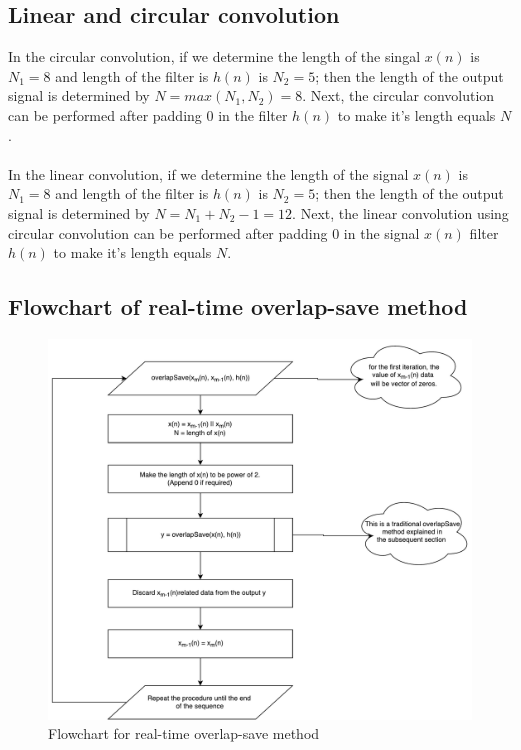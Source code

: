 \begin{refsection}
\subsection*{Linear and circular convolution}
In the circular convolution, if we determine the length of the singal $x(n)$ is $N_{1} = 8$ and length of the filter is  $h(n)$ is $N_{2} = 5$; then the length of the output signal is determined by $N = max(N_{1} , N_{2} )=8$. Next, the circular convolution can be performed after padding $0$ in the filter $h(n)$ to make it's length equals $N$. \\ \\
In the linear convolution, if we determine the length of the signal $x(n)$ is $N_{1} = 8$ and length of the filter is  $h(n)$ is $N_{2} = 5$; then the length of the output signal is determined by $N = N_{1}+N_{2}-1 = 12$. Next, the linear convolution using circular convolution can be performed after padding $0$ in the signal $x(n)$ filter $h(n)$ to make it's length equals $N$.

\subsection*{Flowchart of real-time overlap-save method}
\begin{figure}[h]
	\centering
	\includegraphics[width=14cm]{./algorithms/overlap_save/figures/OS_top.pdf}
	\caption{Flowchart for real-time overlap-save method}
	\label{real-time overlap-save}
	\end{figure}


\end{refsection}
